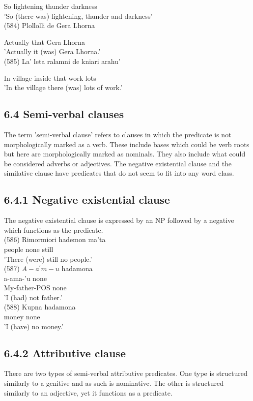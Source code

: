 \documentclass[10pt]{article}
\begin{document}
So lightening thunder darkness\\
'So (there was) lightening, thunder and darkness'\\
(584) Plollolli de Gera Lhorna

Actually that Gera Lhorna\\
'Actually it (was) Gera Lhorna.'\\
(585) La' leta ralamni de kniari arahu'

In village inside that work lots\\
'In the village there (was) lots of work.'

\subsection*{6.4 Semi-verbal clauses}
The term 'semi-verbal clause' refers to clauses in which the predicate is not morphologically marked as a verb. These include bases which could be verb roots but here are morphologically marked as nominals. They also include what could be considered adverbs or adjectives. The negative existential clause and the similative clause have predicates that do not seem to fit into any word class.

\subsection*{6.4.1 Negative existential clause}
The negative existential clause is expressed by an NP followed by a negative which functions as the predicate.\\
(586) Rimormiori hademon ma'ta\\
people none still\\
'There (were) still no people.'\\
(587) \(A-a^{\prime} m-u\) hadamona\\
a-ama-'u none\\
My-father-POS none\\
'I (had) not father.'\\
(588) Kupna hadamona\\
money none\\
'I (have) no money.'

\subsection*{6.4.2 Attributive clause}
There are two types of semi-verbal attributive predicates. One type is structured similarly to a genitive and as such is nominative. The other is structured similarly to an adjective, yet it functions as a predicate.
\end{document}
